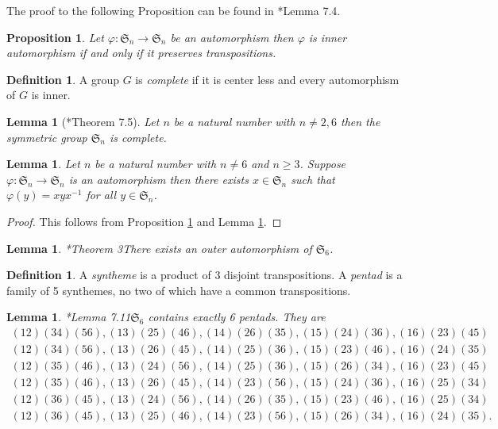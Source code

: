 \documentclass[oneside]{amsart}
\theoremstyle{plain}
\newtheorem{lemma}[theorem]{Lemma} %
\newtheorem{proposition}[theorem]{Proposition}
\theoremstyle{definition}
\newtheorem{definition}[theorem]{Definition} %
\theoremstyle{remark}
\begin{document}
    The proof to the following Proposition can be found in \cite{MR1307623}*{Lemma 7.4}.
    \begin{proposition}\label{inner_if_transpositions}
        Let $\varphi : \mathfrak{S}_n\to\mathfrak{S}_n$ be an automorphism then $\varphi$ is inner automorphism if and only if it preserves transpositions.
    \end{proposition}
    \begin{definition}
        A group $G$ is \emph{complete} if it is center less and every automorphism of $G$ is inner.
    \end{definition}
    \begin{lemma}[\cite{MR1307623}*{Theorem 7.5}]\label{all_complete}
        Let $n$ be a natural number with $n \neq 2, 6$ then the symmetric group $\mathfrak{S}_n$ is complete.
    \end{lemma}
    \begin{lemma}\label{all_automorphisms}
        Let $n$ be a natural number with $n \neq 6$ and $n \geq 3$. Suppose $\varphi : \mathfrak{S}_n\to\mathfrak{S}_n$ is an automorphism then there exists $x \in \mathfrak{S}_n$ such that $\varphi(y) = xyx^{-1}$ for all $y \in \mathfrak{S}_n$.
    \end{lemma}
    \begin{proof}
        This follows from Proposition \ref{inner_if_transpositions} and Lemma \ref{all_complete}.
    \end{proof}
    \begin{lemma}\cite{MR1307623}*{Theorem 3}\label{S_6_holder}
        There exists an outer automorphism of $\mathfrak{S}_6$.
    \end{lemma}
    \begin{definition}
        A \emph{syntheme} is a product of 3 disjoint transpositions. A \emph{pentad} is a family of 5 synthemes, no two of which have a common transpositions.
    \end{definition}
    \begin{lemma}\cite{MR1307623}*{Lemma 7.11}\label{basis_for_outer_automorphisms_of_S6}
        $\mathfrak{S}_6$ contains exactly 6 pentads. They are
        \begin{align*}
            (12)(34)(56), (13)(25)(46), (14)(26)(35), (15)(24)(36), (16)(23)(45)\\
            (12)(34)(56), (13)(26)(45), (14)(25)(36), (15)(23)(46), (16)(24)(35)\\
            (12)(35)(46), (13)(24)(56), (14)(25)(36), (15)(26)(34), (16)(23)(45)\\
            (12)(35)(46), (13)(26)(45), (14)(23)(56), (15)(24)(36), (16)(25)(34)\\
            (12)(36)(45), (13)(24)(56), (14)(26)(35), (15)(23)(46), (16)(25)(34)\\
            (12)(36)(45), (13)(25)(46), (14)(23)(56), (15)(26)(34), (16)(24)(35).
        \end{align*}
    \end{lemma}
\end{document}
